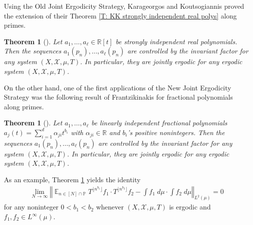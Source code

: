 \documentclass[11pt]{amsart}
\newtheorem{theorem}[lemma]{Theorem}
\theoremstyle{definition}
\DeclareMathOperator*{\E}{\mathbb{E}}
\renewcommand{\P}{{\mathbb P}}
\newcommand{\R}{{\mathbb R}}
\newcommand{\CX}{{\mathcal X}}
\newcommand{\norm}[1]{\left\Vert #1\right\Vert}
\newcommand{\1}{{\mathbf{1}}}
\newcommand{\sfloor}[1]{{\lfloor #1 \rfloor}}
\begin{document}
    Using the Old Joint Ergodicity Strategy, Karageorgos and Koutsogiannis proved the extension of their Theorem \ref{T: KK strongly independent real polys} along primes.
\begin{theorem}[{\cite[Theorem 2.14]{KK19}}]
    Let $a_1, \ldots, a_\ell\in\R[t]$ be  strongly independent real polynomials. 
    Then the sequences $a_1(p_n), \ldots, a_\ell(p_n)$ are controlled by the invariant factor for any system $(X, \CX, \mu, T)$. In particular, they are jointly ergodic for any ergodic system $(X, \CX, \mu, T)$.
\end{theorem}
    
    On the other hand, one of the first applications of the New Joint Ergodicity Strategy was the following result of Frantzikinakis for fractional polynomials along primes.
    \begin{theorem}[{\cite[Theorem 1.1]{Fr22}}]\label{T: Fr fractional polynomials along primes}
        Let $a_1, \ldots, a_\ell$ be linearly independent fractional polynomials $a_j(t) = \sum_{i=1}^d \alpha_{ji}t^{b_i}$ with $\alpha_{ji}\in\R$ and $b_i$'s positive nonintegers. %
            Then the sequences $a_1(p_n), \ldots, a_\ell(p_n)$ are controlled by the invariant factor for any system $(X, \CX, \mu, T)$. In particular, they are jointly ergodic for any ergodic system $(X, \CX, \mu, T)$.
    \end{theorem}
    As an example, Theorem \ref{T: Fr fractional polynomials along primes} yields the identity
    \begin{align*}
        \lim_{N\to\infty}\norm{\E_{n\in[N]\cap\P}T^{\sfloor{n^{b_1}}}f_1 \cdot T^{\sfloor{n^{b_2}}}f_2 - \int f_1\; d\mu \cdot \int f_2\; d\mu}_{L^2(\mu)} = 0
    \end{align*}
    for any noninteger $0<b_1<b_2$ whenever $(X, \CX, \mu, T)$ is ergodic and $f_1, f_2\in L^\infty(\mu)$.
\end{document}
